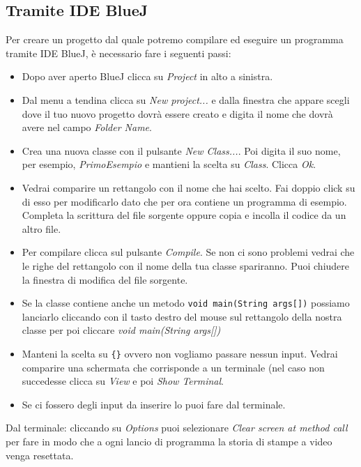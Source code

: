 \documentclass{article}
\begin{document}
\subsection{Tramite IDE BlueJ}
\noindent Per creare un progetto dal quale potremo compilare ed eseguire un programma tramite IDE BlueJ, è necessario fare i seguenti passi:
\begin{itemize}
\item Dopo aver aperto BlueJ clicca su \textit{Project} in alto a sinistra. 
\item Dal menu a tendina clicca su \textit{New project...} e dalla finestra che appare scegli dove il tuo nuovo progetto dovrà essere creato e digita il nome che dovrà avere nel campo \textit{Folder Name}.
\item Crea una nuova classe con il pulsante \textit{New Class...}. Poi digita il suo nome, per esempio, \textit{PrimoEsempio} e mantieni la scelta su \textit{Class}. Clicca \textit{Ok}.
\item Vedrai comparire un rettangolo con il nome che hai scelto. Fai doppio click su di esso per modificarlo dato che per ora contiene un programma di esempio. Completa la scrittura del file sorgente oppure copia e incolla il codice da un altro file.
\item Per compilare clicca sul pulsante \textit{Compile}. Se non ci sono problemi vedrai che le righe del rettangolo con il nome della tua classe spariranno. Puoi chiudere la finestra di modifica del file sorgente.
\item Se la classe contiene anche un metodo \texttt{void main(String args[])} possiamo lanciarlo cliccando con il tasto destro del mouse sul rettangolo della nostra classe per poi cliccare \textit{void main(String args[])} 
\item Manteni la scelta su \texttt{\{\}} ovvero non vogliamo passare nessun input. Vedrai comparire una schermata che corrisponde a un terminale (nel caso non succedesse clicca su \textit{View} e poi \textit{Show Terminal}.
\item Se ci fossero degli input da inserire lo puoi fare dal terminale.
\end{itemize}
Dal terminale: cliccando su \textit{Options} puoi selezionare \textit{Clear screen at method call} per fare in modo che a ogni lancio di programma la storia di stampe a video venga resettata.
\end{document}
